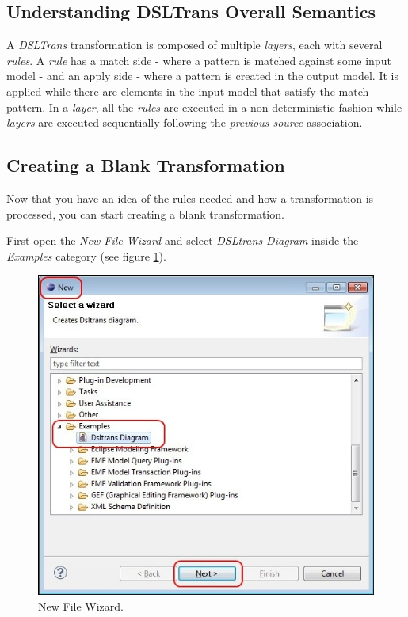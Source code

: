 \clearpage

\subsection{Understanding DSLTrans Overall Semantics}

A \emph{DSLTrans} transformation is composed of multiple
\emph{layers}, each with several \emph{rules}. A \emph{rule} has a match side -
where a pattern is matched against some input model - and an apply side - where a pattern is
created in the output model. It is applied while there are elements
in the input model that satisfy the match pattern. In a \emph{layer}, all the
\emph{rules} are executed in a non-deterministic fashion while \emph{layers} are
executed sequentially following the \emph{previous source} association.

\clearpage

\subsection{Creating a Blank Transformation}

Now that you have an idea of the rules needed and how a transformation is
processed, you can start creating a blank transformation.

First open the \emph{New File Wizard} and select \emph{DSLtrans Diagram} inside
the \emph{Examples} category (see figure \ref{fig:create_dsltransformation_1}).

\begin{figure}[h]
\begin{center}
  \includegraphics[scale=0.6]{imgs/create_dsltransformation_1.jpg}
  \caption{New File Wizard.}
  \label{fig:create_dsltransformation_1}
\end{center}
\end{figure}

